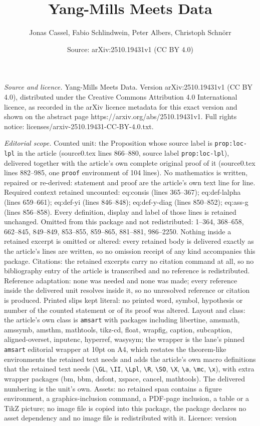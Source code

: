 \documentclass[10pt,a4paper]{amsart}
\title[Yang-Mills Meets Data]{Yang-Mills Meets Data}
\author{Jonas Cassel, Fabio Schlindwein, Peter Albers, Christoph Schn\"orr}
\date{Source: arXiv:2510.19431v1 (CC BY 4.0)}
\begin{document}
\maketitle

\noindent\emph{Source and licence.} Yang-Mills Meets Data. Version arXiv:2510.19431v1 (CC BY 4.0), distributed under the Creative Commons Attribution 4.0 International licence, as recorded in the arXiv licence metadata for this exact version and shown on the abstract page https://arxiv.org/abs/2510.19431v1. Full rights notice: licenses/arxiv-2510.19431-CC-BY-4.0.txt.\par\smallskip

\noindent\textit{Editorial scope.} Counted unit: the Proposition whose source label is \texttt{prop:loc-lpl} in the article (source0.tex lines 866--880, source label \texttt{prop:loc-lpl}), delivered together with the article's own complete original proof of it (source0.tex lines 882--985, one \texttt{proof} environment of 104 lines). No mathematics is written, repaired or re-derived: statement and proof are the article's own text line for line. Required context retained uncounted: eq:consis (lines 365--367); eq:def-lalpha (lines 659--661); eq:def-yi (lines 846--848); eq:def-y-diag (lines 850--852); eq:ass-g (lines 856--858). Every definition, display and label of those lines is retained unchanged. Omitted from this package and not redistributed: 1--364, 368--658, 662--845, 849--849, 853--855, 859--865, 881--881, 986--2250. Nothing inside a retained excerpt is omitted or altered: every retained body is delivered exactly as the article's lines are written, so no omission receipt of any kind accompanies this package. Citations: the retained excerpts carry no citation command at all, so no bibliography entry of the article is transcribed and no reference is redistributed. Reference adaptation: none was needed and none was made; every reference inside the delivered unit resolves inside it, so no unresolved reference or citation is produced. Printed slips kept literal: no printed word, symbol, hypothesis or number of the counted statement or of its proof was altered. Layout and class: the article's own class is \texttt{amsart} with packages including libertine, amsmath, amssymb, amsthm, mathtools, tikz-cd, float, wrapfig, caption, subcaption, aligned-overset, inputenc, hyperref, wasysym; the wrapper is the lane's pinned \texttt{amsart} editorial wrapper at 10pt on A4, which restates the theorem-like environments the retained text needs and adds the article's own macro definitions that the retained text needs (\texttt{\textbackslash GL}, \texttt{\textbackslash II}, \texttt{\textbackslash Lpl}, \texttt{\textbackslash R}, \texttt{\textbackslash SO}, \texttt{\textbackslash X}, \texttt{\textbackslash a}, \texttt{\textbackslash mc}, \texttt{\textbackslash x}), with extra wrapper packages (bm, bbm, dsfont, xspace, cancel, mathtools). The delivered numbering is the unit's own. Assets: no retained span contains a figure environment, a graphics-inclusion command, a PDF-page inclusion, a table or a TikZ picture; no image file is copied into this package, the package declares no asset dependency and no image file is redistributed with it. Licence: version 
\end{document}
